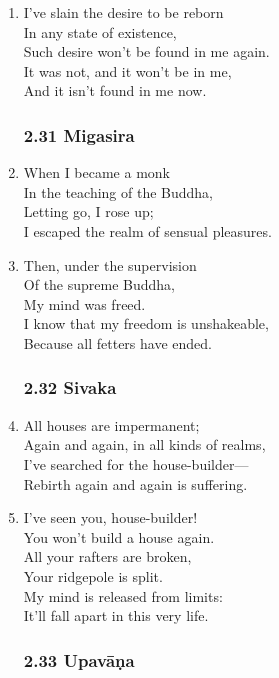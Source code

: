 \documentclass[10pt, openany]{book}
\begin{document}
\begin{enumerate}
\item I’ve slain the desire to be reborn \\
In any state of existence,\\
Such desire won’t be found in me again.\\
It was not, and it won’t be in me,\\
And it isn’t found in me now.

\subsubsection*{2.31 Migasira}

\item When I became a monk\\
In the teaching of the Buddha,\\
Letting go, I rose up;\\
I escaped the realm of sensual pleasures.

\item Then, under the supervision \\
Of the supreme Buddha,\\
My mind was freed.\\
I know that my freedom is unshakeable,\\
Because all fetters have ended.

\subsubsection*{2.32 Sivaka}

\item All houses are impermanent;\\
Again and again, in all kinds of realms,\\
I’ve searched for the house-builder—\\
Rebirth again and again is suffering.

\item I’ve seen you, house-builder!\\
You won’t build a house again.\\
All your rafters are broken,\\
Your ridgepole is split.\\
My mind is released from limits:\\
It’ll fall apart in this very life.

\subsubsection*{2.33 Upavāṇa}


\end{enumerate}
\end{document}
